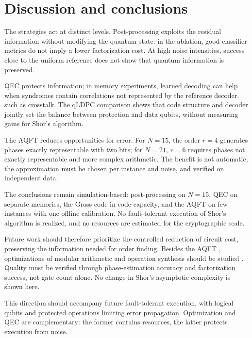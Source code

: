 \section{Discussion and conclusions}

The strategies act at distinct levels. Post-processing exploits the residual information
without modifying the quantum state: in the ablation, good classifier metrics do not imply
a lower factorization cost. At high noise intensities, success close to the uniform
reference does not show that quantum information is preserved.

QEC protects information; in memory experiments, learned decoding can help when syndromes
contain correlations not represented by the reference decoder, such as crosstalk. The
qLDPC comparison shows that code structure and decoder jointly set the balance between
protection and data qubits, without measuring gains for Shor's algorithm.

The AQFT reduces opportunities for error. For \(N = 15\), the order \(r = 4\) generates
phases exactly representable with two bits; for \(N = 21\), \(r = 6\) requires phases not
exactly representable and more complex arithmetic. The benefit is not automatic; the
approximation must be chosen per instance and noise, and verified on independent data.

The conclusions remain simulation-based: post-processing on \(N = 15\), QEC on separate
memories, the Gross code in code-capacity, and the AQFT on few instances with one offline
calibration. No fault-tolerant execution of Shor's algorithm is realized, and no resources
are estimated for the cryptographic scale.

Future work should therefore prioritize the controlled reduction of circuit cost,
preserving the information needed for order finding. Besides the AQFT
\cite{en-barencoAQFT1996}, optimizations of modular arithmetic and operation synthesis
should be studied \cite{en-gidney2021}. Quality must be verified through phase-estimation
accuracy and factorization success, not gate count alone. No change in Shor's asymptotic
complexity is shown here.

This direction should accompany future fault-tolerant execution, with logical qubits and
protected operations limiting error propagation. Optimization and QEC are complementary:
the former contains resources, the latter protects execution from noise.
